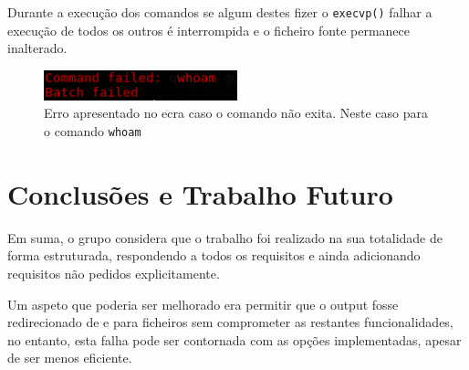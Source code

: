 \documentclass[12pt,a4paper]{report}
\begin{document}
    Durante a execução dos comandos se algum destes fizer o
    \texttt{execvp()} falhar a execução de todos os outros é interrompida
    e o ficheiro fonte permanece inalterado.

    \begin{figure}[h]
        \centering
        \includegraphics[width=0.5\textwidth]{./images/execError.png}
        \caption{Erro apresentado no ecra caso o comando não exita. Neste caso
                    para o comando \texttt{whoam}}
    \end{figure}

\chapter{Conclusões e Trabalho Futuro}
    Em suma, o grupo considera que o trabalho foi realizado na sua
    totalidade de forma estruturada, respondendo a todos os requisitos e ainda
    adicionando requisitos não pedidos explicitamente.

    Um aspeto que poderia ser melhorado era permitir que o output fosse
    redirecionado de e para ficheiros sem comprometer as restantes
    funcionalidades, no entanto, esta falha pode ser contornada com as opções
    implementadas, apesar de ser menos eficiente.
\end{document}
